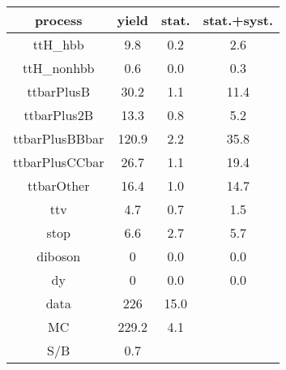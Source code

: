 \begin{tabular}{cccc}
\hline
    process     &  yield  &  stat.  &  stat.+syst.  \\
\hline
    ttH\_hbb     &   9.8   &   0.2   &      2.6      \\
   ttH\_nonhbb   &   0.6   &   0.0   &      0.3      \\
   ttbarPlusB   &  30.2   &   1.1   &     11.4      \\
  ttbarPlus2B   &  13.3   &   0.8   &      5.2      \\
 ttbarPlusBBbar &  120.9  &   2.2   &     35.8      \\
 ttbarPlusCCbar &  26.7   &   1.1   &     19.4      \\
   ttbarOther   &  16.4   &   1.0   &     14.7      \\
      ttv       &   4.7   &   0.7   &      1.5      \\
      stop      &   6.6   &   2.7   &      5.7      \\
    diboson     &    0    &   0.0   &      0.0      \\
       dy       &    0    &   0.0   &      0.0      \\
      data      &   226   &  15.0   &               \\
       MC       &  229.2  &   4.1   &               \\
      S/B       &   0.7   &         &               \\
\hline
\end{tabular}